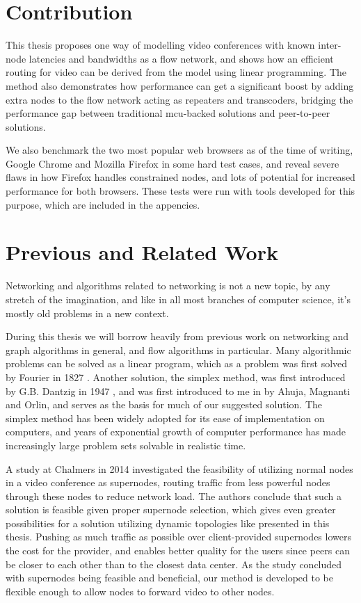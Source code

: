 \section{Contribution}

This thesis proposes one way of modelling video conferences with known inter-node latencies and bandwidths as a flow network, and shows how an efficient routing for video can be derived from the model using linear programming. The method also demonstrates how performance can get a significant boost by adding extra nodes to the flow network acting as repeaters and transcoders, bridging the performance gap between traditional \gls{mcu}-backed solutions and peer-to-peer solutions.

We also benchmark the two most popular web browsers as of the time of writing, Google Chrome and Mozilla Firefox in some hard test cases, and reveal severe flaws in how Firefox handles constrained nodes, and lots of potential for increased performance for both browsers. These tests were run with tools developed for this purpose, which are included in the appencies.


\section{Previous and Related Work}

Networking and algorithms related to networking is not a new topic, by any stretch of the imagination, and like in all most branches of computer science, it's mostly old problems in a new context.

During this thesis we will borrow heavily from previous work on networking and graph algorithms in general, and flow algorithms in particular. Many algorithmic problems can be solved as a linear program, which as a problem was first solved by Fourier in 1827 \cite{sierksma2001linear}. Another solution, the simplex method, was first introduced by G.B. Dantzig in 1947 \cite{sierksma2001linear}, and was first introduced to me in \cite{ahuja1988network} by Ahuja, Magnanti and Orlin, and serves as the basis for much of our suggested solution. The simplex method has been widely adopted for its ease of implementation on computers, and years of exponential growth of computer performance has made increasingly large problem sets solvable in realistic time.

A study at Chalmers in 2014\cite{tree-topology-webrtc} investigated the feasibility of utilizing normal nodes in a video conference as supernodes, routing traffic from less powerful nodes through these nodes to reduce network load. The authors conclude that such a solution is feasible given proper supernode selection, which gives even greater possibilities for a solution utilizing dynamic topologies like presented in this thesis. Pushing as much traffic as possible over client-provided supernodes lowers the cost for the provider, and enables better quality for the users since peers can be closer to each other than to the closest data center. As the study concluded with supernodes being feasible and beneficial, our method is developed to be flexible enough to allow nodes to forward video to other nodes.

